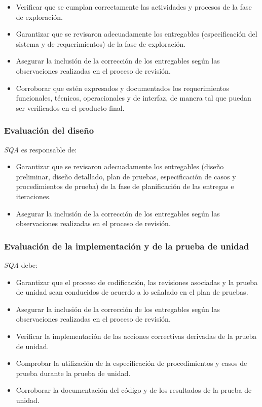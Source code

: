 	\begin{itemize}
		\item 
		Verificar que se cumplan correctamente las actividades y procesos de la fase de exploración.
		\item
		Garantizar que se revisaron adecuadamente los entregables (especificación del sistema y de requerimientos) de la fase de exploración. 
		\item
		Asegurar la inclusión de la corrección de los entregables según las observaciones realizadas en el proceso de revisión. 
		\item
		Corroborar que estén expresados y documentados los requerimientos funcionales, técnicos, operacionales y de interfaz, de manera tal que puedan ser verificados en el producto final.
	\end{itemize}

\subsubsection{Evaluación del diseño}

\emph{SQA} es responsable de:

	\begin{itemize}
		\item 
		Garantizar que se revisaron adecuadamente los entregables (diseño preliminar, diseño detallado, plan de pruebas, especificación de casos y procedimientos de prueba) de la fase de planificación de las entregas e iteraciones.
		\item
		Asegurar la inclusión de la corrección de los entregables según las observaciones realizadas en el proceso de revisión.
	\end{itemize}
	
\subsubsection{Evaluación de la implementación y de la prueba de unidad}

\emph{SQA} debe:

	\begin{itemize}
		\item 
		Garantizar que el proceso de codificación, las revisiones asociadas y la prueba de unidad sean conducidos de acuerdo a lo señalado en el plan de pruebas.
		\item
		Asegurar la inclusión de la corrección de los entregables según las observaciones realizadas en el proceso de revisión.
		\item
		Verificar la implementación de las acciones correctivas derivadas de la prueba de unidad.
		\item
		Comprobar la utilización de la especificación de procedimientos y casos de prueba durante la prueba de unidad. 
		\item
		Corroborar la documentación del código y de los resultados de la prueba de unidad.
	\end{itemize}

